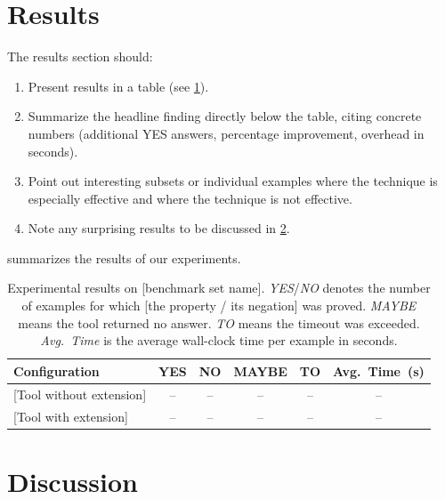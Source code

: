 \section{Results}\label{sec:results}

The results section should:
\begin{enumerate}
    \item Present results in a table (see \cref{tab:results}).
    \item Summarize the headline finding directly below the table, citing concrete
          numbers (additional YES answers, percentage improvement, overhead in seconds).
    \item Point out interesting subsets or individual examples where the technique
          is especially effective and where the technique is not effective.
    \item Note any surprising results to be discussed in \cref{sec:discussion}.
\end{enumerate}

 summarizes the results of our experiments.

\begin{table}[H]
    \centering
    \caption{Experimental results on [benchmark set name].
             \emph{YES}/\emph{NO} denotes the number of examples for which
             [the property / its negation] was proved.
             \emph{MAYBE} means the tool returned no answer.
             \emph{TO} means the timeout was exceeded.
             \emph{Avg.~Time} is the average wall-clock time per example in seconds.}
    \label{tab:results}
    \begin{tabular}{lccccc}
        \toprule
        \textbf{Configuration} &
        \textbf{YES} & \textbf{NO} & \textbf{MAYBE} & \textbf{TO} & \textbf{Avg.~Time~(s)} \\
        \midrule
        {[Tool without extension]} & -- & -- & -- & -- & -- \\
        {[Tool with extension]}    & -- & -- & -- & -- & -- \\
        \bottomrule
    \end{tabular}
\end{table}

\section{Discussion}\label{sec:discussion}

